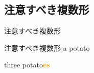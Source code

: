\documentclass[aspectratio=169,xcolor={dvipsnames,table}]{beamer}
\newcommand{\myaudio}[1]{\href{#1}{\faVolumeUp}}
\begin{document}
\subsection{注意すべき複数形}
\begin{frame}[plain]{注意すべき複数形}

\hspace{15pt}
\pause

\bigskip

\bigskip

\hspace{15pt}

\myaudio{./audio/005_singular_plural_05.mp3}
\end{frame}
\begin{frame}[plain]{注意すべき複数形}
\hspace{15pt}
\pause
{\LARGE a potato}
\pause

\bigskip

\bigskip

\hspace{15pt}
\pause
{\LARGE three  potato\textcolor{orange}{\bfseries es}}

\myaudio{./audio/005_singular_plural_06.mp3}
\end{frame}
\end{document}
